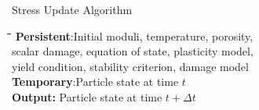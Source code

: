   \begin{table}[p]
    \caption{Stress Update Algorithm} \label{algo1}
    \vspace{12pt}
    \begin{tabbing}
    \quad \=\quad \=\quad \=\quad \=\quad \kill
    {\bf Persistent}:Initial moduli, temperature, porosity, \\
      \>\>        scalar damage, equation of state, plasticity model, \\
      \>\>        yield condition, stability criterion, damage model\\
    {\bf Temporary}:Particle state at time $t$ \\
    {\bf Output:} Particle state at time $t+\Delta t$\\ \\


\end{tabbing}
\end{table}
